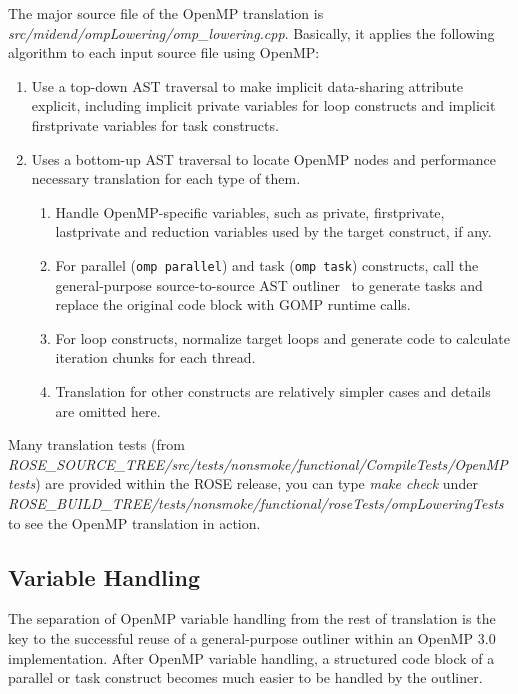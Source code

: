 The major source file of the OpenMP translation is \textit{src/midend/ompLowering/omp\_lowering.cpp}. 
Basically, it applies the following algorithm to each input source file using OpenMP:
\begin{enumerate}
\item  Use a top-down AST traversal to make implicit data-sharing attribute explicit, including implicit private variables for loop constructs and implicit firstprivate variables for task constructs. 
\item  Uses a bottom-up AST traversal to locate OpenMP nodes and performance necessary translation for each type of them.
\begin{enumerate}
\item Handle OpenMP-specific variables, such as private, firstprivate, lastprivate and reduction variables used by the target construct, if any.
\item For parallel (\lstinline{omp parallel}) and task (\lstinline{omp task}) constructs, call the general-purpose source-to-source AST outliner~\cite{LiaoEffective2009} to generate tasks and replace the original code block with GOMP runtime calls.
\item For loop constructs, normalize target loops and generate code to
calculate iteration chunks for each thread.
\item Translation for other constructs are relatively simpler cases and
details are omitted here.
\end{enumerate}
\end{enumerate}

Many translation tests (from
\textit{ROSE\_SOURCE\_TREE/src/tests/nonsmoke/functional/CompileTests/OpenMP tests}) are
provided within the ROSE release, you can type
\textit{make check} under
\textit{ROSE\_BUILD\_TREE/tests/nonsmoke/functional/roseTests/ompLoweringTests} to see the
OpenMP translation in action.

\subsection{Variable Handling}
The separation of OpenMP variable handling from the rest of translation is
the key to the successful reuse of a general-purpose outliner within an OpenMP 3.0 implementation. 
After OpenMP variable handling, a structured code block of a parallel or task construct becomes much easier to be handled by the outliner.

